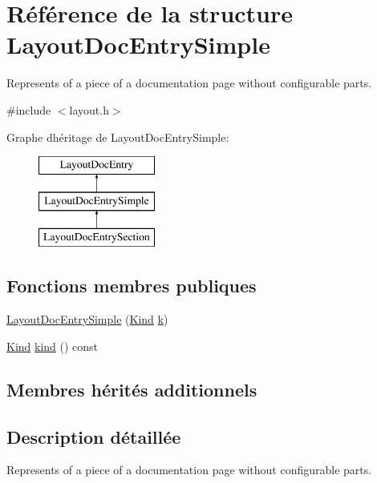 \hypertarget{struct_layout_doc_entry_simple}{}\section{Référence de la structure Layout\+Doc\+Entry\+Simple}
\label{struct_layout_doc_entry_simple}


Represents of a piece of a documentation page without configurable parts.  




{\ttfamily \#include $<$layout.\+h$>$}

Graphe d\textquotesingle{}héritage de Layout\+Doc\+Entry\+Simple\+:\begin{figure}[H]
\begin{center}
\leavevmode
\includegraphics[height=3.000000cm]{struct_layout_doc_entry_simple}
\end{center}
\end{figure}
\subsection*{Fonctions membres publiques}
\begin{DoxyCompactItemize}
\item 
\hyperlink{struct_layout_doc_entry_simple_aca8a78abdd4bb324e1d3a2503ac79788}{Layout\+Doc\+Entry\+Simple} (\hyperlink{struct_layout_doc_entry_a89dcbe762ed7e7f7790d8c034cf8ea01}{Kind} \hyperlink{060__command__switch_8tcl_a20363f854eb4098a446733d63d34dbc1}{k})
\item 
\hyperlink{struct_layout_doc_entry_a89dcbe762ed7e7f7790d8c034cf8ea01}{Kind} \hyperlink{struct_layout_doc_entry_simple_a49e64d8985d81aa29b84f9d9552788ec}{kind} () const 
\end{DoxyCompactItemize}
\subsection*{Membres hérités additionnels}


\subsection{Description détaillée}
Represents of a piece of a documentation page without configurable parts. 

